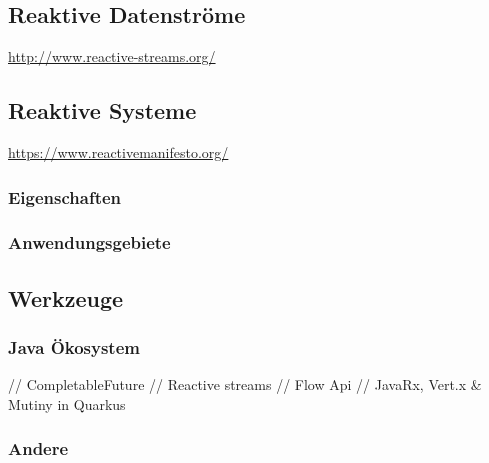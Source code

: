 \subsection{Reaktive Datenströme}
\label{section.reaktive_datenströme}
\url{http://www.reactive-streams.org/}

\subsection{Reaktive Systeme}
\label{section:reaktive_systeme}
\url{https://www.reactivemanifesto.org/}

\subsubsection{Eigenschaften}

\subsubsection{Anwendungsgebiete}

\subsection{Werkzeuge}
\subsubsection{Java Ökosystem}
// CompletableFuture
// Reactive streams
// Flow Api
// JavaRx, Vert.x \& Mutiny in Quarkus
\subsubsection{Andere}

